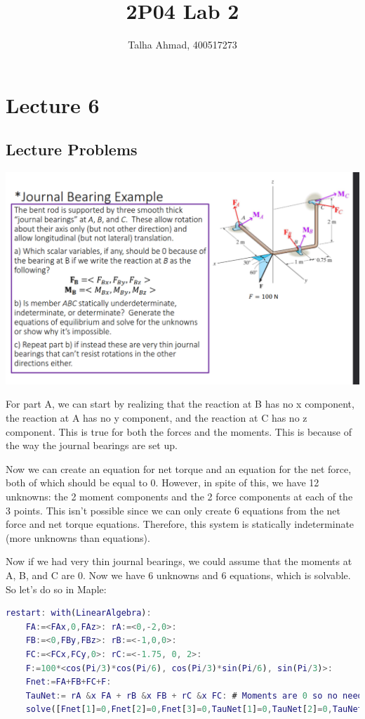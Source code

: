 \documentclass{article}[14pt, letterpaper, Times New Roman]
\title{2P04 Lab 2}
\author{Talha Ahmad, 400517273}
\begin{document}
\maketitle

\section{Lecture 6}

\subsection{Lecture Problems}

\includegraphics[width=15cm]{l6-lq1.png}

For part A, we can start by realizing that the reaction at B has no x component, the reaction at A has no y component, and the reaction at C has no z component.
This is true for both the forces and the moments.
This is because of the way the journal bearings are set up.

Now we can create an equation for net torque and an equation for the net force, both of which should be equal to 0.
However, in spite of this, we have 12 unknowns: the 2 moment components and the 2 force components at each of the 3 points.
This isn't possible since we can only create 6 equations from the net force and net torque equations.
Therefore, this system is statically indeterminate (more unknowns than equations).

Now if we had very thin journal bearings, we could assume that the moments at A, B, and C are 0.
Now we have 6 unknowns and 6 equations, which is solvable.
So let's do so in Maple:

\begin{lstlisting}[language=matlab, basicstyle=\small]
	restart: with(LinearAlgebra):
	FA:=<FAx,0,FAz>: rA:=<0,-2,0>:
	FB:=<0,FBy,FBz>: rB:=<-1,0,0>:
	FC:=<FCx,FCy,0>: rC:=<-1.75, 0, 2>:
	F:=100*<cos(Pi/3)*cos(Pi/6), cos(Pi/3)*sin(Pi/6), sin(Pi/3)>:
	Fnet:=FA+FB+FC+F:
	TauNet:= rA &x FA + rB &x FB + rC &x FC: # Moments are 0 so no need to add
	solve([Fnet[1]=0,Fnet[2]=0,Fnet[3]=0,TauNet[1]=0,TauNet[2]=0,TauNet[3]=0]);
\end{lstlisting}
\end{document}
